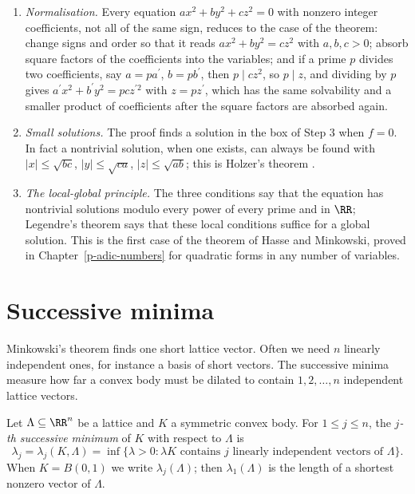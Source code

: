 \begin{remark}\label{geometry-of-numbers:remark-legendre}
\begin{enumerate}
\item \emph{Normalisation.} Every equation $ax^2 + by^2 + cz^2 = 0$ with nonzero integer coefficients, not all of the same sign, reduces to the case of the theorem: change signs and order so that it reads
$ax^2 + by^2 = cz^2$ with $a, b, c > 0$; absorb square factors of the coefficients into the variables; and if a prime $p$ divides two coefficients, say $a = pa^{\prime}$, $b = pb^{\prime}$, then
$p \mid cz^2$, so $p \mid z$, and dividing by $p$ gives $a^{\prime}x^2 + b^{\prime}y^2 = pcz^{\prime2}$ with $z = pz^{\prime}$, which has the same solvability and a smaller product of coefficients after the
square factors are absorbed again.
\item \emph{Small solutions.} The proof finds a solution in the box of Step 3 when $f = 0$. In fact a nontrivial solution, when one exists, can always be found with $|x| \leq \sqrt{bc}$,
$|y| \leq \sqrt{ca}$, $|z| \leq \sqrt{ab}$; this is Holzer's theorem \cite{mordell-diophantine}.
\item \emph{The local-global principle.} The three conditions say that the equation has nontrivial solutions modulo every power of every prime and in $\RR$; Legendre's theorem says that these
local conditions suffice for a global solution. This is the first case of the theorem of Hasse and Minkowski, proved in Chapter~\ref{p-adic-numbers} for quadratic forms in any number of variables.
\end{enumerate}
\end{remark}

\section{Successive minima}\label{geometry-of-numbers:section-successive-minima}

Minkowski's theorem finds one short lattice vector. Often we need $n$ linearly independent ones, for instance a basis of short vectors. The successive minima measure how far a convex body must
be dilated to contain $1, 2, \ldots, n$ independent lattice vectors.

\begin{definition}\label{geometry-of-numbers:definition-successive-minima}
Let $\Lambda \subseteq \RR^n$ be a lattice and $K$ a symmetric convex body. For $1 \leq j \leq n$, the \emph{$j$-th successive minimum} of $K$ with respect to $\Lambda$ is
\[
\lambda_j = \lambda_j(K, \Lambda) = \inf\{\lambda > 0 : \lambda K \text{ contains } j \text{ linearly independent vectors of } \Lambda\}.
\]
When $K = B(0, 1)$ we write $\lambda_j(\Lambda)$; then $\lambda_1(\Lambda)$ is the length of a shortest nonzero vector of $\Lambda$.
\end{definition}

